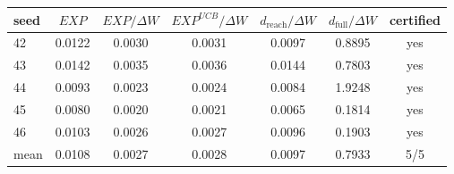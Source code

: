 \begin{tabular}{lcccccc}
\toprule
seed & $EXP$ & $EXP/\Delta W$ & $EXP^{UCB}/\Delta W$ & $d_{\text{reach}}/\Delta W$ & $d_{\text{full}}/\Delta W$ & certified \\
\midrule
42 & 0.0122 & 0.0030 & 0.0031 & 0.0097 & 0.8895 & yes \\
43 & 0.0142 & 0.0035 & 0.0036 & 0.0144 & 0.7803 & yes \\
44 & 0.0093 & 0.0023 & 0.0024 & 0.0084 & 1.9248 & yes \\
45 & 0.0080 & 0.0020 & 0.0021 & 0.0065 & 0.1814 & yes \\
46 & 0.0103 & 0.0026 & 0.0027 & 0.0096 & 0.1903 & yes \\
\midrule
mean & 0.0108 & 0.0027 & 0.0028 & 0.0097 & 0.7933 & 5/5 \\
\bottomrule
\end{tabular}
